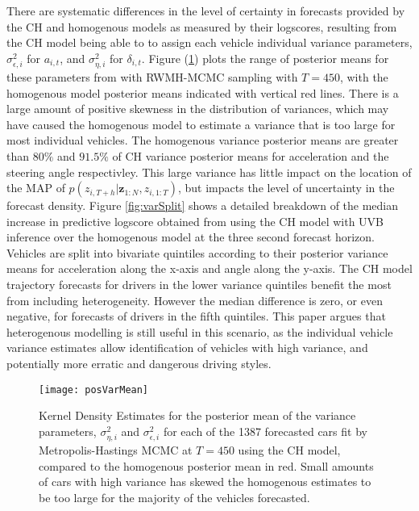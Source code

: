 \documentclass[12pt,a4paper]{article}\usepackage[]{graphicx}\usepackage[]{color}
\begin{document}
There are systematic differences in the level of certainty in forecasts provided by the CH and homogenous models as measured by their logscores, resulting from the CH model being able to to assign each vehicle individual variance parameters,  $\sigma^2_{\epsilon, i}$ for $a_{i, t}$, and $\sigma^2_{\eta, i}$ for $\delta_{i, t}$. Figure (\ref{fig:posVarMean}) plots the range of posterior means for these parameters from with RWMH-MCMC sampling with $T = 450$, with the homogenous model posterior means indicated with vertical red lines. There is a large amount of positive skewness in the distribution of variances, which may have caused the homogenous model to estimate a variance that is too large for most individual vehicles. The homogenous variance posterior means are greater than $80\%$ and $91.5\%$ of CH variance posterior means for acceleration and the steering angle respectivley. This large variance has little impact on the location of the MAP of $p(z_{i, T+h} | \textbf{z}_{1:N}, z_{i, 1:T})$, but impacts the level of uncertainty in the forecast density. Figure \ref{fig:varSplit} shows a detailed breakdown of the median increase in predictive logscore obtained from using the CH model with UVB inference over the homogenous model at the three second forecast horizon. Vehicles are split into bivariate quintiles according to their posterior variance means for acceleration along the x-axis and angle along the y-axis. The CH model trajectory forecasts for drivers in the lower variance quintiles benefit the most from including heterogeneity. However the median difference is zero, or even negative, for forecasts of drivers in the fifth quintiles. This paper argues that heterogenous modelling is still useful in this scenario, as the individual vehicle variance estimates allow identification of vehicles with high variance, and potentially more erratic and dangerous driving styles.
\\


\begin{figure}[ht]
\centering
\texttt{[image: posVarMean]}
\caption{Kernel Density Estimates for the posterior mean of the variance parameters, $\sigma^2_{\eta, i}$ and $\sigma^2_{\epsilon, i}$ for each of the 1387 forecasted cars fit by Metropolis-Hastings MCMC at $T = 450$ using the CH model, compared to the homogenous posterior mean in red. Small amounts of cars with high variance has skewed the homogenous estimates to be too large for the majority of the vehicles forecasted.}
\label{fig:posVarMean}
\end{figure}
\end{document}
